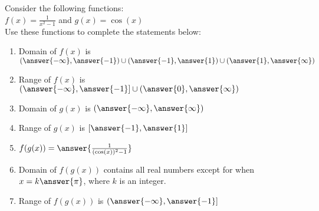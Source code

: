 \documentclass{ximera}
\author{David Kish}
\begin{document}
\begin{exercise}
Consider the following functions:\\
$f(x)=\frac{1}{x^{2}-1}$ and $g(x)=\cos(x)$ \\
Use these functions to complete the statements below:
\begin{enumerate}
\item Domain of $f(x)$ is $(\answer{-\infty},\answer{-1}) \cup (\answer{-1},\answer{1}) \cup (\answer{1},\answer{\infty})$
\item Range of $f(x)$ is $(\answer{-\infty},\answer{-1}] \cup (\answer{0},\answer{\infty})$
\item Domain of $g(x)$ is $(\answer{-\infty},\answer{\infty})$
\item Range of $g(x)$ is $[\answer{-1},\answer{1}]$
\item $f(g(x))=\answer{\frac{1}{(\cos (x))^{2}-1}}$
\item Domain of $f(g(x))$ contains all real numbers except for when $x = k\answer{\pi}$, where $k$ is an integer.
\item Range of $f(g(x))$ is $(\answer{-\infty},\answer{-1}]$\\
 \end{enumerate} 
\end{exercise}
\end{document}
